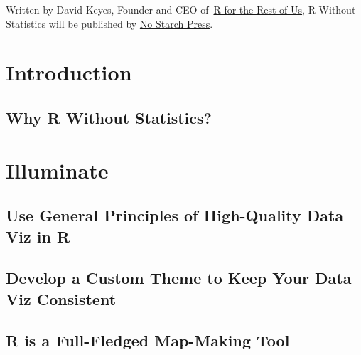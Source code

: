 \documentclass[
]{book}
\begin{document}
Written by David Keyes, Founder and CEO of~\href{https://rfortherestofus.com/}{R for the Rest of Us}, R Without Statistics will be published by \href{https://nostarch.com/}{No Starch Press}.

\hypertarget{part-introduction}{%
\part*{Introduction}\label{part-introduction}}

\hypertarget{why-r-without-statistics}{%
\chapter*{Why R Without Statistics?}\label{why-r-without-statistics}}

\hypertarget{part-illuminate}{%
\part*{Illuminate}\label{part-illuminate}}

\hypertarget{use-general-principles-of-high-quality-data-viz-in-r}{%
\chapter*{Use General Principles of High-Quality Data Viz in R}\label{use-general-principles-of-high-quality-data-viz-in-r}}

\hypertarget{develop-a-custom-theme-to-keep-your-data-viz-consistent}{%
\chapter*{Develop a Custom Theme to Keep Your Data Viz Consistent}\label{develop-a-custom-theme-to-keep-your-data-viz-consistent}}

\hypertarget{r-is-a-full-fledged-map-making-tool}{%
\chapter*{R is a Full-Fledged Map-Making Tool}\label{r-is-a-full-fledged-map-making-tool}}
\end{document}
